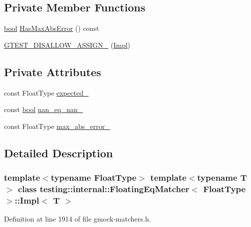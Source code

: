 \subsection*{Private Member Functions}
\begin{DoxyCompactItemize}
\item 
\hyperlink{classbool}{bool} \hyperlink{classtesting_1_1internal_1_1FloatingEqMatcher_1_1Impl_a3e3539f59004154b8af47a87a83a2d59}{Has\+Max\+Abs\+Error} () const
\item 
\hyperlink{classtesting_1_1internal_1_1FloatingEqMatcher_1_1Impl_a03db98ebe05c5af9b61f20607cbad630}{G\+T\+E\+S\+T\+\_\+\+D\+I\+S\+A\+L\+L\+O\+W\+\_\+\+A\+S\+S\+I\+G\+N\+\_\+} (\hyperlink{classtesting_1_1internal_1_1FloatingEqMatcher_1_1Impl}{Impl})
\end{DoxyCompactItemize}
\subsection*{Private Attributes}
\begin{DoxyCompactItemize}
\item 
const Float\+Type \hyperlink{classtesting_1_1internal_1_1FloatingEqMatcher_1_1Impl_ab7d6c6eed79e4bd83fc3758bb53395eb}{expected\+\_\+}
\item 
const \hyperlink{classbool}{bool} \hyperlink{classtesting_1_1internal_1_1FloatingEqMatcher_1_1Impl_a77073561281e81e81ac8c870a0689e7a}{nan\+\_\+eq\+\_\+nan\+\_\+}
\item 
const Float\+Type \hyperlink{classtesting_1_1internal_1_1FloatingEqMatcher_1_1Impl_afec03a9fc571d9907979f088ff5e55e5}{max\+\_\+abs\+\_\+error\+\_\+}
\end{DoxyCompactItemize}


\subsection{Detailed Description}
\subsubsection*{template$<$typename Float\+Type$>$\newline
template$<$typename T$>$\newline
class testing\+::internal\+::\+Floating\+Eq\+Matcher$<$ Float\+Type $>$\+::\+Impl$<$ T $>$}



Definition at line 1914 of file gmock-\/matchers.\+h.



